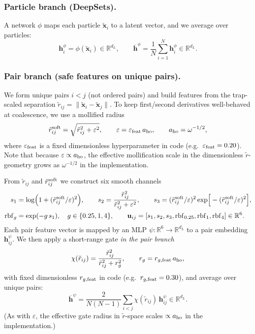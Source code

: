 \documentclass[superscriptaddress,unsortedaddress,amsmath,amssymb,aps]{revtex4-2}
\begin{document}
\subsubsection{Particle branch (DeepSets).}
A network $\phi$ maps each particle $\tilde{\mathbf x}_i$ to a latent vector, and we average over particles:
\[
  \mathbf h_i^\phi=\phi(\tilde{\mathbf x}_i)\in\mathbb R^{d_L},\qquad
  \overline{\mathbf h}^{\phi}=\frac{1}{N}\sum_{i=1}^N \mathbf h_i^\phi\in\mathbb R^{d_L}.
\]

\subsubsection{Pair branch (safe features on unique pairs).}
We form unique pairs $i<j$ (not ordered pairs) and build features from the trap-scaled separation
$\tilde r_{ij}=\|\tilde{\mathbf x}_i-\tilde{\mathbf x}_j\|$.
To keep first/second derivatives well-behaved at coalescence, we use a mollified radius
\begin{equation}
  \tilde r^{\rm soft}_{ij}
  = \sqrt{\tilde r_{ij}^2 + \varepsilon^2},
  \qquad
  \varepsilon = \varepsilon_{\rm feat}\,a_{\rm ho},
  \qquad
  a_{\rm ho}=\omega^{-1/2},
\end{equation}
where $\varepsilon_{\rm feat}$ is a fixed dimensionless hyperparameter in code (e.g.\ $\varepsilon_{\rm feat}=0.20$).
Note that because $\varepsilon\propto a_{\rm ho}$, the effective mollification scale in the dimensionless
$\tilde r$-geometry grows as $\omega^{-1/2}$ in the implementation.

From $\tilde r_{ij}$ and $\tilde r_{ij}^{\rm soft}$ we construct six smooth channels
\begin{align}
  s_1 &= \log\!\Big(1+(\tilde r^{\rm soft}_{ij}/\varepsilon)^2\Big),\qquad
  s_2 = \frac{\tilde r_{ij}^{2}}{\tilde r_{ij}^{2}+\varepsilon^2},\qquad
  s_3 = (\tilde r^{\rm soft}_{ij}/\varepsilon)^{2}\exp\!\Big[-(\tilde r^{\rm soft}_{ij}/\varepsilon)^{2}\Big],\notag\\
  \mathrm{rbf}_g &= \exp(-g\,s_1),\quad g\in\{0.25,1,4\},\qquad
  \mathbf u_{ij}=[s_1,s_2,s_3,\mathrm{rbf}_{0.25},\mathrm{rbf}_{1},\mathrm{rbf}_4]\in\mathbb R^{6}.
  \label{eq:safe-feats-impl}
\end{align}
Each pair feature vector is mapped by an MLP $\psi:\mathbb R^6\to\mathbb R^{d_L}$ to a pair embedding
$\mathbf h^\psi_{ij}$. We then apply a short-range gate \emph{in the pair branch}
\begin{equation}
  \chi(\tilde r_{ij})=\frac{\tilde r_{ij}^2}{\tilde r_{ij}^2+r_g^2},
  \qquad
  r_g=r_{g,{\rm feat}}\,a_{\rm ho},
\end{equation}
with fixed dimensionless $r_{g,{\rm feat}}$ in code (e.g.\ $r_{g,{\rm feat}}=0.30$), and average over unique pairs:
\[
  \overline{\mathbf h}^{\psi}=
  \frac{2}{N(N-1)}\sum_{i<j} \chi(\tilde r_{ij})\,\mathbf h^\psi_{ij}\in\mathbb R^{d_L}.
\]
(As with $\varepsilon$, the effective gate radius in $\tilde r$-space scales $\propto a_{\rm ho}$ in the implementation.)
\end{document}

